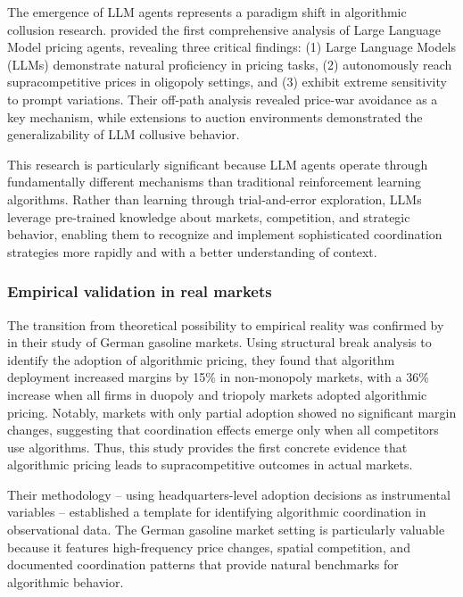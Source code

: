 The emergence of LLM agents represents a paradigm shift in algorithmic collusion research. \textcite{fish_algorithmic_2025} provided the first comprehensive analysis of Large Language Model pricing agents, revealing three critical findings: (1) Large Language Models (LLMs) demonstrate natural proficiency in pricing tasks, (2) autonomously reach supracompetitive prices in oligopoly settings, and (3) exhibit extreme sensitivity to prompt variations. Their off-path analysis revealed price-war avoidance as a key mechanism, while extensions to auction environments demonstrated the generalizability of LLM collusive behavior.

This research is particularly significant because LLM agents operate through fundamentally different mechanisms than traditional reinforcement learning algorithms. Rather than learning through trial-and-error exploration, LLMs leverage pre-trained knowledge about markets, competition, and strategic behavior, enabling them to recognize and implement sophisticated coordination strategies more rapidly and with a better understanding of context.

\subsubsection*{Empirical validation in real markets}

The transition from theoretical possibility to empirical reality was confirmed by \textcite{assad_algorithmic_2024} in their study of German gasoline markets. Using structural break analysis to identify the adoption of algorithmic pricing, they found that algorithm deployment increased margins by 15\% in non-monopoly markets, with a 36\% increase when all firms in duopoly and triopoly markets adopted algorithmic pricing. Notably, markets with only partial adoption showed no significant margin changes, suggesting that coordination effects emerge only when all competitors use algorithms. Thus, this study provides the first concrete evidence that algorithmic pricing leads to supracompetitive outcomes in actual markets.

Their methodology -- using headquarters-level adoption decisions as instrumental variables -- established a template for identifying algorithmic coordination in observational data. The German gasoline market setting is particularly valuable because it features high-frequency price changes, spatial competition, and documented coordination patterns that provide natural benchmarks for algorithmic behavior.

